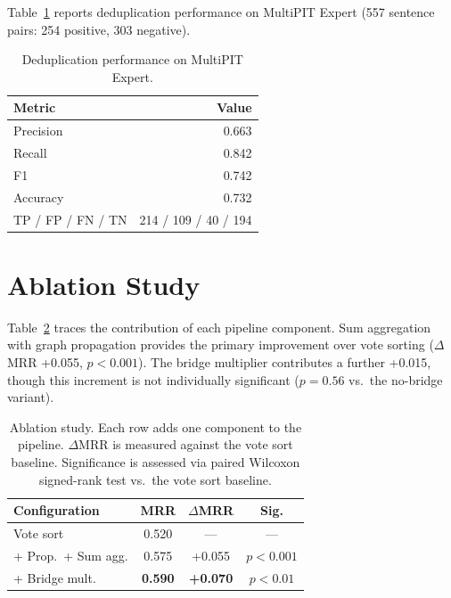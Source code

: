 Table~\ref{tab:dedup} reports deduplication performance on MultiPIT Expert \citep{dou-etal-2022-improving} (557 sentence pairs: 254 positive, 303 negative).

\begin{table}[ht]
\centering
\small
\begin{tabular}{lr}
\toprule
\textbf{Metric} & \textbf{Value} \\
\midrule
Precision & 0.663 \\
Recall    & 0.842 \\
F1        & 0.742 \\
Accuracy  & 0.732 \\
\midrule
TP / FP / FN / TN & 214 / 109 / 40 / 194 \\
\bottomrule
\end{tabular}
\caption{Deduplication performance on MultiPIT Expert.}
\label{tab:dedup}
\end{table}

\section{Ablation Study}
\label{app:ablation}

Table~\ref{tab:ablation} traces the contribution of each pipeline component. Sum aggregation with graph propagation provides the primary improvement over vote sorting ($\Delta$MRR +0.055, $p < 0.001$). The bridge multiplier contributes a further +0.015, though this increment is not individually significant ($p = 0.56$ vs.\ the no-bridge variant).

\begin{table}[ht]
\centering
\footnotesize
\begin{tabular}{lccc}
\toprule
\textbf{Configuration} & \textbf{MRR} & \textbf{$\Delta$MRR} & \textbf{Sig.} \\
\midrule
Vote sort              & 0.520 & ---            & ---  \\
+ Prop.\ + Sum agg.   & 0.575 & +0.055         & $p{<}0.001$   \\
+ Bridge mult.         & \textbf{0.590} & \textbf{+0.070} & $p{<}0.01$   \\
\bottomrule
\end{tabular}
\caption{Ablation study. Each row adds one component to the pipeline. $\Delta$MRR is measured against the vote sort baseline. Significance is assessed via paired Wilcoxon signed-rank test vs.\ the vote sort baseline.}
\label{tab:ablation}
\end{table}
